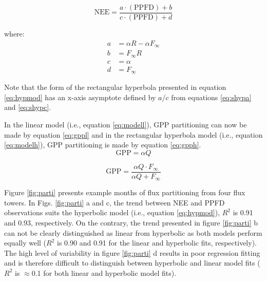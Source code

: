 \begin{equation}
\label{eq:hypmod}
    \text{NEE} = \frac{a \cdot (\text{PPFD}) + b}{c \cdot (\text{PPFD}) + d}
\end{equation}

\noindent where:
\begin{subequations}
\label{eq:shyp}
\begin{align}
    a&= \alpha R - \alpha F_{\infty} \label{eq:shypa}\\
    b&= F_{\infty} R \label{eq:shypb}\\
    c&= \alpha \label{eq:shypc}\\
    d&= F_{\infty} \label{eq:shypd}
\end{align}
\end{subequations}

\noindent Note that the form of the rectangular hyperbola presented in equation \ref{eq:hypmod} has an x-axis asymptote defined by $a/c$ from equations \ref{eq:shypa} and \ref{eq:shypc}. 

In the linear model (i.e., equation \ref{eq:modell}), GPP partitioning can now be made by equation \ref{eq:gppl} and in the rectangular hyperbola model (i.e., equation \ref{eq:modelh}), GPP partitioning is made by equation \ref{eq:gpph}.
\begin{equation}
\label{eq:gppl}
    \text{GPP} = \alpha Q
\end{equation}

\begin{equation}
\label{eq:gpph}
     \text{GPP} = \frac{\alpha Q \cdot F_{\infty}}{\alpha Q + F_{\infty}}
\end{equation}

Figure \ref{fig:parti} presents example months of flux partitioning from four flux towers.  
In Figs. \ref{fig:parti} a and c, the trend between NEE and PPFD observations suits the hyperbolic model (i.e., equation \ref{eq:hypmod}), $R^{2}$ is 0.91 and 0.93, respectively. 
On the contrary, the trend presented in figure \ref{fig:parti} b can not be clearly distinguished as linear from hyperbolic as both models perform equally well ($R^{2}$ is 0.90 and 0.91 for the linear and hyperbolic fits, respectively). 
The high level of variability in figure \ref{fig:parti} d results in poor regression fitting and is therefore difficult to distinguish between hyperbolic and linear model fits ($R^{2}$ is $\approx$0.1 for both linear and hyperbolic model fits).

